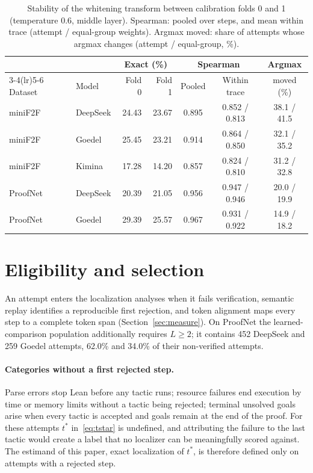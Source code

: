 \begin{table}[h]
\caption{Stability of the whitening transform between calibration folds 0 and 1 (temperature 0.6, middle layer). Spearman: pooled over steps, and mean within trace (attempt / equal-group weights). Argmax moved: share of attempts whose argmax changes (attempt / equal-group, \%).}
\label{tab:folds}
\begin{center}
\footnotesize
\setlength{\tabcolsep}{4pt}
\begin{tabular}{llrrccc}
\toprule
& & \multicolumn{2}{c}{Exact (\%)} & \multicolumn{2}{c}{Spearman} & Argmax\\
\cmidrule(lr){3-4}\cmidrule(lr){5-6}
Dataset & Model & Fold 0 & Fold 1 & Pooled & Within trace & moved (\%)\\
\midrule
miniF2F & DeepSeek & 24.43 & 23.67 & 0.895 & 0.852 / 0.813 & 38.1 / 41.5\\
miniF2F & Goedel & 25.45 & 23.21 & 0.914 & 0.864 / 0.850 & 32.1 / 35.2\\
miniF2F & Kimina & 17.28 & 14.20 & 0.857 & 0.824 / 0.810 & 31.2 / 32.8\\
ProofNet & DeepSeek & 20.39 & 21.05 & 0.956 & 0.947 / 0.946 & 20.0 / 19.9\\
ProofNet & Goedel & 29.39 & 25.57 & 0.967 & 0.931 / 0.922 & 14.9 / 18.2\\
\bottomrule
\end{tabular}
\end{center}
\end{table}

\section{Eligibility and selection}\label{app:eligibility}

An attempt enters the localization analyses when it fails verification, semantic replay identifies a reproducible first rejection, and token alignment maps every step to a complete token span (Section~\ref{sec:measure}). On ProofNet the learned-comparison population additionally requires $L\ge2$; it contains 452 DeepSeek and 259 Goedel attempts, 62.0\% and 34.0\% of their non-verified attempts.

\paragraph{Categories without a first rejected step.} Parse errors stop Lean before any tactic runs; resource failures end execution by time or memory limits without a tactic being rejected; terminal unsolved goals arise when every tactic is accepted and goals remain at the end of the proof. For these attempts $t^*$ in~\eqref{eq:tstar} is undefined, and attributing the failure to the last tactic would create a label that no localizer can be meaningfully scored against. The estimand of this paper, exact localization of $t^*$, is therefore defined only on attempts with a rejected step.

